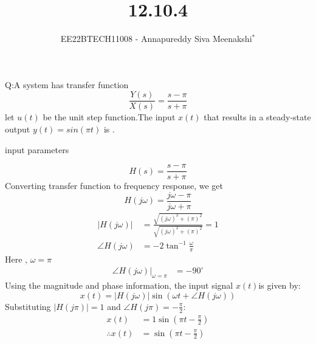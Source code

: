 \documentclass[journal,12pt,twocolumn]{IEEEtran}
\theoremstyle{remark}
\begin{document}

\vspace{3cm}

\title{12.10.4}
\author{EE22BTECH11008 - Annapureddy Siva Meenakshi$^{*}$%
}
\maketitle
\bigskip

\renewcommand{\thefigure}{\theenumi}
\renewcommand{\thetable}{\theenumi}
Q:A system has transfer function
 \[\frac{Y(s)}{X(s)}=\frac {s-\pi}{s+\pi}\]
 let $u(t)$ be the unit step function.The input $x(t)$ that results in a steady-state output $y(t)=sin(\pi t)$ is \underline{\quad}.
\solution
\begin{table}[!ht]
    \centering
        
    \caption{input parameters}
    \label{tab:in_21_t1}
\end{table}
 \begin{equation}
     H(s)=\frac{s-\pi}{s+\pi}
 \end{equation} 
 Converting transfer function to frequency response, we get
 \begin{equation}
     H(j\omega)=\frac{j\omega-\pi}{j\omega+\pi}
 \end{equation}
 \begin{align}
     |H(j\omega)|&=\frac{\sqrt{(j\omega)^2+(\pi)^2}}{\sqrt{(j\omega)^2+(\pi)^2}}=1\\
     \angle H(j\omega)&=-2\tan^{-1}{\frac{\omega}{\pi}}
 \end{align}
 Here , $\omega=\pi$
 \begin{align}
    \angle H(j\omega)\big|_{\omega=\pi} &= -90^\circ
\end{align}
Using the magnitude and phase information, the input signal $x(t)$is given by:
\begin{equation}
    x(t) = |H(j\omega)|\sin(\omega t + \angle H(j\omega))
\end{equation}
Substituting $|H(j\pi)|=1 $ and $\angle H(j\pi) = -\frac{\pi}{2}$:
\begin{align}
     x(t) &= 1\sin\left(\pi t - \frac{\pi}{2}\right)\\
     \therefore x(t) &= \sin\left(\pi t - \frac{\pi}{2}\right)
\end{align}
 
\end{document}
